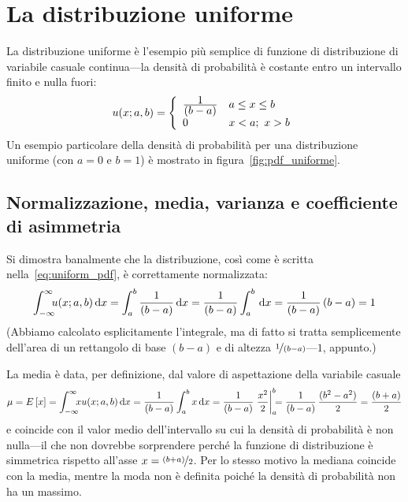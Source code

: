 

\section{La distribuzione uniforme}
\label{sec:distribuzione_uniforme}

La distribuzione uniforme è l'esempio più semplice di funzione di
distribuzione di variabile casuale continua---la densità di probabilità
è costante entro un intervallo finito e nulla fuori:
\begin{align}\label{eq:uniform_pdf}
  \uniformpdf[a, b]{x} = \left \{ \begin{array}{ll}
    \frac{\displaystyle 1}{\displaystyle (b - a)} & a \leq x \leq b\\
    0 & x < a ; ~ x > b
  \end{array} \right.
\end{align}
Un esempio particolare della densità di probabilità per una distribuzione
uniforme (con $a = 0$ e $b = 1$) è mostrato in figura~\ref{fig:pdf_uniforme}.



\subsection{Normalizzazione, media, varianza e coefficiente di asimmetria}

Si dimostra banalmente che la distribuzione, così come è scritta
nella~\eqref{eq:uniform_pdf}, è correttamente normalizzata:
\begin{align*}
  \intinf \uniformpdf[a,b]{x} \diff =
  \int_a^b \frac{1}{(b - a)} \diff =
  \frac{1}{(b - a)} \int_a^b \diff =
  \frac{1}{(b - a)}\, (b - a) = 1
\end{align*}
(Abbiamo calcolato esplicitamente l'integrale, ma di fatto si tratta
semplicemente dell'area di un rettangolo di base $(b - a)$ e di altezza
$\nicefrac{1}{(b - a)}$---$1$, appunto.)

La media è data, per definizione, dal valore di aspettazione della
variabile casuale
\begin{align}\label{eq:media_uniforme}
  \mu = \expect{x} = \intinf x \uniformpdf[a,b]{x} \diff =
  \frac{1}{(b - a)} \int_a^b x \diff =
  \frac{1}{(b - a)} \eval{\frac{x^2}{2}}{a}{b} =
  \frac{1}{(b - a)} \, \frac{(b^2 - a^2)}{2} = \frac{(b + a)}{2}
\end{align}
e coincide con il valor medio dell'intervallo su cui la densità di
probabilità è non nulla---il che non dovrebbe sorprendere perché la
funzione di distribuzione è simmetrica rispetto all'asse
$x = \nicefrac{(b + a)}{2}$. Per lo stesso motivo la mediana coincide con la
media, mentre la moda non è definita poiché la densità di probabilità
non ha un massimo.

